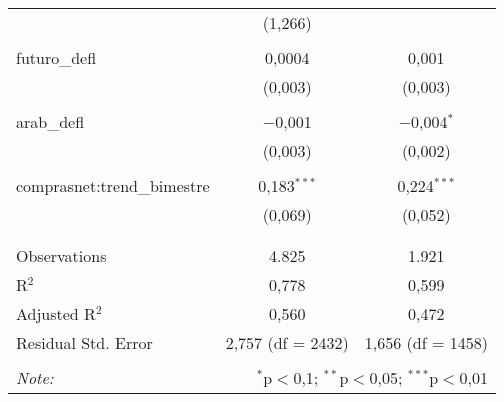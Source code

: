 \begin{table}[!htbp]
\begin{tabular}{@{\extracolsep{5pt}}lcc}
  & (1,266) &  \\ 
  & & \\ 
 futuro\_defl & 0,0004 & 0,001 \\ 
  & (0,003) & (0,003) \\ 
  & & \\ 
 arab\_defl & $-$0,001 & $-$0,004$^{*}$ \\ 
  & (0,003) & (0,002) \\ 
  & & \\ 
 comprasnet:trend\_bimestre & 0,183$^{***}$ & 0,224$^{***}$ \\ 
  & (0,069) & (0,052) \\ 
  & & \\ 
\hline \\[-1.8ex] 
Observations & 4.825 & 1.921 \\ 
R$^{2}$ & 0,778 & 0,599 \\ 
Adjusted R$^{2}$ & 0,560 & 0,472 \\ 
Residual Std. Error & 2,757 (df = 2432) & 1,656 (df = 1458) \\ 
\hline 
\hline \\[-1.8ex] 
\textit{Note:}  & \multicolumn{2}{r}{$^{*}$p$<$0,1; $^{**}$p$<$0,05; $^{***}$p$<$0,01} \\ 
\end{tabular} 
\end{table} 
